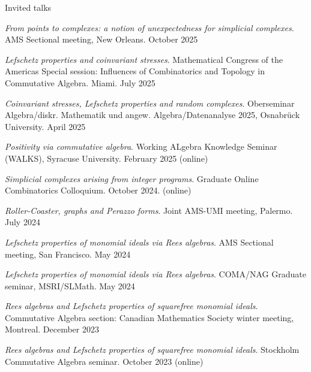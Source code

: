 \documentclass[12pt]{resume} %
\begin{document}
\begin{rSection}{Invited talks}
    \item \textit{From points to complexes: a notion of unexpectedness for simplicial complexes}. AMS Sectional meeting, New Orleans. October 2025 
    \item \textit{Lefschetz properties and coinvariant stresses}. Mathematical Congress of the Americas Special session: Influences of Combinatorics and Topology in Commutative Algebra. Miami. July 2025 
    \item \textit{Coinvariant stresses, Lefschetz properties and random complexes}. Oberseminar Algebra/diskr. Mathematik und angew. Algebra/Datenanalyse 2025, Osnabrück University. April 2025 
    \item \textit{Positivity via commutative algebra}. Working ALgebra Knowledge Seminar (WALKS), Syracuse University. February 2025 (online)
    \item \textit{Simplicial complexes arising from integer programs}. Graduate Online Combinatorics Colloquium. October 2024. (online)
    \item \textit{Roller-Coaster, graphs and Perazzo forms}. Joint AMS-UMI meeting, Palermo. July 2024
    \item \textit{Lefschetz properties of monomial ideals via Rees algebras}. AMS Sectional meeting, San Francisco. May 2024  
    \item \textit{Lefschetz properties of monomial ideals via Rees algebras}. COMA/NAG Graduate seminar, \newline MSRI/SLMath. May 2024  
    \item \textit{Rees algebras and Lefschetz properties of squarefree monomial ideals}. Commutative Algebra section: Canadian Mathematics Society winter meeting, Montreal. December 2023 
    \item \textit{Rees algebras and Lefschetz properties of squarefree monomial ideals}. Stockholm Commutative Algebra seminar. October 2023 (online)
\end{rSection}
\end{document}
